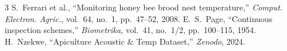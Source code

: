 \documentclass[10pt,conference,letterpaper]{IEEEtran}
\begin{document}
\begin{thebibliography}{3}
 S.~Ferrari et al., ``Monitoring honey bee brood nest temperature,'' \textit{Comput. Electron. Agric.}, vol.~64, no.~1, pp.~47--52, 2008.
 E.~S.~Page, ``Continuous inspection schemes,'' \textit{Biometrika}, vol.~41, no.~1/2, pp.~100--115, 1954.
 H.~Nzekwe, ``Apiculture Acoustic \& Temp Dataset,'' \textit{Zenodo}, 2024.
\end{thebibliography}
\end{document}
